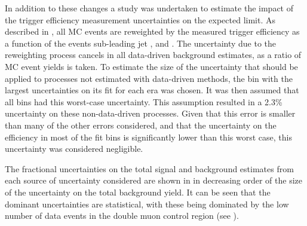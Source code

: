 In addition to these changes a study was undertaken to estimate the impact of the trigger efficiency measurement uncertainties on the expected limit. As described in , all \ac{MC} events are reweighted by the measured trigger efficiency as a function of the events sub-leading jet \pt, \METnoMU and \Mjj. The uncertainty due to the reweighting process cancels in all data-driven background estimates, as a ratio of \ac{MC} event yields is taken. To estimate the size of the uncertainty that should be applied to processes not estimated with data-driven methods, the bin with the largest uncertainties on its fit for each era was chosen. It was then assumed that all bins had this worst-case uncertainty. This assumption resulted in a 2.3\% uncertainty on these non-data-driven processes. Given that this error is smaller than many of the other errors considered, and that the uncertainty on the efficiency in most of the fit bins is significantly lower than this worst case, this uncertainty was considered negligible.

The fractional uncertainties on the total signal and background estimates from each source of uncertainty considered are shown in  in decreasing order of the size of the uncertainty on the total background yield. It can be seen that the dominant uncertainties are statistical, with these being dominated by the low number of data events in the double muon control region (see ).

